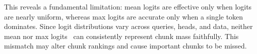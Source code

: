 This reveals a fundamental limitation: mean logits are effective only when logits are nearly uniform, whereas max logits are accurate only when a single token dominates. Since logit distributions vary across queries, heads, and data, neither mean nor max logits~\cite{lai2026minimaxsparseattention} can consistently represent chunk mass faithfully. This mismatch may alter chunk rankings and cause important chunks to be missed.
